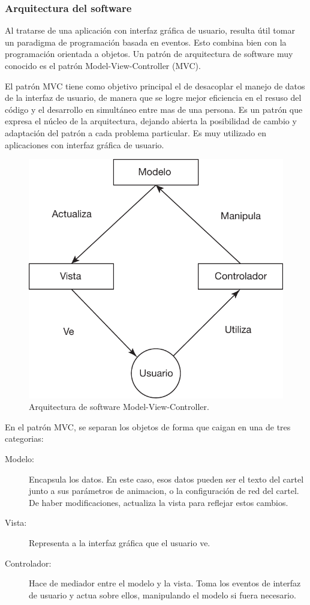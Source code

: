 \subsubsection{Arquitectura del software}
Al tratarse de una aplicación con interfaz gráfica de usuario, resulta útil tomar un paradigma de programación basada en eventos. Esto combina bien con la programación orientada a objetos. Un patrón de arquitectura de software muy conocido es el patrón Model-View-Controller (MVC).

El patrón MVC \cite{MVC} tiene como objetivo principal el de desacoplar el manejo de datos de la interfaz de usuario, de manera que se logre mejor eficiencia en el resuso del código y el desarrollo en simultáneo entre mas de una persona. Es un patrón que expresa el núcleo de la arquitectura, dejando abierta la posibilidad de cambio y adaptación del patrón a cada problema particular. Es muy utilizado en aplicaciones con interfaz gráfica de usuario.

\begin{figure} [h!]
	\centering
	\includegraphics[scale=0.8]{imagenes/mvc.pdf}
	\caption{Arquitectura de software Model-View-Controller.}
	\label{fig:mvc}
\end{figure}

En el patrón MVC, se separan los objetos de forma que caigan en una de tres categorias:
\begin{description}
	\item[Modelo: ] Encapsula los datos. En este caso, esos datos pueden ser el texto del cartel junto a sus parámetros de animacion, o la configuración de red del cartel. De haber modificaciones, actualiza la vista para reflejar estos cambios.
	\item[Vista: ] Representa a la interfaz gráfica que el usuario ve.
	\item[Controlador: ] Hace de mediador entre el modelo y la vista. Toma los eventos de interfaz de usuario y actua sobre ellos, manipulando el modelo si fuera necesario.
\end{description}

